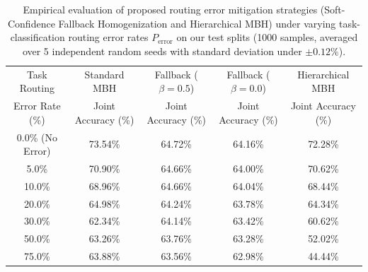 \documentclass{article}
\theoremstyle{plain}
\theoremstyle{definition}
\theoremstyle{remark}
\begin{document}
\begin{table}[t]
\centering
\caption{Empirical evaluation of proposed routing error mitigation strategies (Soft-Confidence Fallback Homogenization and Hierarchical MBH) under varying task-classification routing error rates $P_{\text{error}}$ on our test splits (1000 samples, averaged over 5 independent random seeds with standard deviation under $\pm 0.12\%$).}
\label{tab:mitigation_results}
\vskip 0.15in
\setlength{\tabcolsep}{5pt}
\begin{tabular}{ccccc}
\toprule
Task Routing & Standard MBH & Fallback ($\beta=0.5$) & Fallback ($\beta=0.0$) & Hierarchical MBH \\
Error Rate (\%) & Joint Accuracy (\%) & Joint Accuracy (\%) & Joint Accuracy (\%) & Joint Accuracy (\%) \\
\midrule
0.0\% (No Error) & 73.54\% & 64.72\% & 64.16\% & 72.28\% \\
5.0\%            & 70.90\% & 64.66\% & 64.00\% & 70.62\% \\
10.0\%           & 68.96\% & 64.66\% & 64.04\% & 68.44\% \\
20.0\%           & 64.98\% & 64.24\% & 63.78\% & 64.34\% \\
30.0\%           & 62.34\% & 64.14\% & 63.42\% & 60.62\% \\
50.0\%           & 63.26\% & 63.76\% & 63.28\% & 52.02\% \\
75.0\%           & 63.88\% & 63.56\% & 62.98\% & 44.44\% \\
\bottomrule
\end{tabular}
\end{table}
\end{document}
